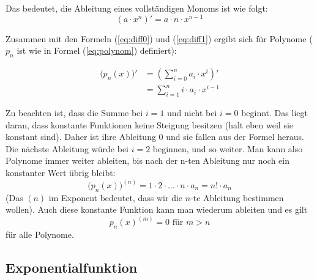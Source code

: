 \noindent Das bedeutet, die Ableitung eines vollständigen Monoms ist wie folgt:
\begin{equation}
\left( a\cdot x^n \right)' = a\cdot n\cdot x^{n-1}
\end{equation}


Zusammen mit den Formeln (\ref{eq:diff0}) und (\ref{eq:diff1}) ergibt sich für Polynome ($p_n$ ist wie in Formel (\ref{eq:polynom}) definiert):

\begin{equation}
\begin{split}
\big( p_n(x) \big)' &= \left( \sum_{i=0}^{n} a_i \cdot x^i \right)' \\
&= \sum_{i=1}^{n} i\cdot a_i \cdot x^{i-1}
\end{split}
\end{equation}

Zu beachten ist, dass die Summe bei $i=1$ und nicht bei $i=0$ beginnt. Das liegt daran, dass konstante Funktionen keine Steigung besitzen (halt eben weil sie konstant sind). Daher ist ihre Ableitung 0 und sie fallen aus der Formel heraus. Die nächste Ableitung würde bei $i=2$ beginnen, und so weiter. Man kann also Polynome immer weiter ableiten, bis nach der n-ten Ableitung nur noch ein konstanter Wert übrig bleibt:
\begin{equation*}
\big( p_n(x)\big)^{(n)} = 1\cdot 2 \cdot \dots \cdot n \cdot a_n = n! \cdot a_n
\end{equation*}
(Das $(n)$ im Exponent bedeutet, dass wir die $n$-te Ableitung bestimmen wollen). Auch diese konstante Funktion kann man wiederum ableiten und es gilt 
\begin{equation*}
p_n(x)^{(m)} = 0 \text{ für } m>n
\end{equation*}
für alle Polynome.


\subsection{Exponentialfunktion}

